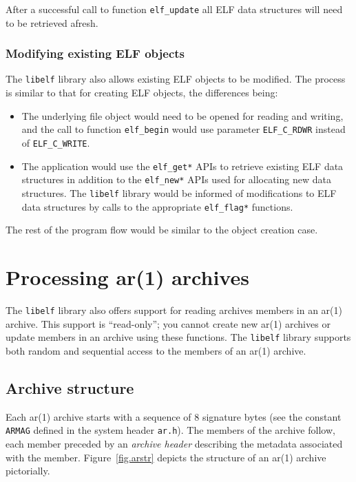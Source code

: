 \documentclass[a4paper,pdftex]{book}
\newcommand{\constant}[1]{\texttt{#1}}
\newcommand{\function}[1]{\texttt{#1}}
\newcommand{\filename}[1]{\texttt{#1}}
\newcommand{\firstterm}[1]{\textit{#1}}
\newcommand{\library}[1]{\texttt{#1}}
\begin{document}
After a successful call to function \function{elf\_update} all ELF
data structures will need to be retrieved afresh.%

\subsection{Modifying existing ELF objects}\label{sec.modifying-elf}

The \library{libelf} library also allows existing ELF objects to be
modified.  The process is similar to that for creating ELF objects,
the differences being:%

\begin{itemize}
\item The underlying file object would need to be opened for reading
  and writing, and the call to function \function{elf\_begin} would
  use parameter \constant{ELF\_C\_RDWR} instead of
  \constant{ELF\_C\_WRITE}.
\item The application would use the \function{elf\_get*} APIs to
  retrieve existing ELF data structures in addition to the
  \function{elf\_new*} APIs used for allocating new data structures.
  The \library{libelf} library would be informed of modifications to
  ELF data structures by calls to the appropriate
  \function{elf\_flag*} functions.%
\end{itemize}

The rest of the program flow would be similar to the object creation
case.

\chapter{Processing ar(1) archives}\label{chap.ar}

The \library{libelf} library also offers support for reading archives
members in an ar(1) archive.  This support is ``read-only''; you
cannot create new ar(1) archives or update members in an archive using
these functions.  The \library{libelf} library supports both random
and sequential access to the members of an ar(1) archive.

\section{Archive structure}

Each ar(1) archive starts with a sequence of 8 signature bytes (see
the constant \constant{ARMAG} defined in the
system header \filename{ar.h}).  The members of the archive follow,
each member preceded by an \firstterm{archive
  header} describing the metadata associated
with the member.  Figure~\vref{fig.arstr} depicts the structure of an
ar(1) archive pictorially.
\end{document}
